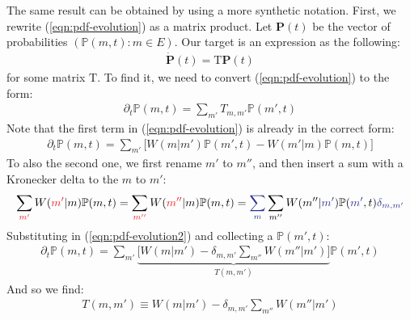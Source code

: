 \documentclass[../../main.tex]{subfiles}
\begin{document}
The same result can be obtained by using a more synthetic notation. First, we rewrite (\ref{eqn:pdf-evolution}) as a matrix product. Let $\bm{P}(t)$ be the vector of probabilities $(\mathbb{P}(m,t)\colon m \in E)$. Our target is an expression as the following:
\begin{align}\label{eqn:pdf-evolution-matrixform}
    \dot{\bm{P}}(t) = \mathrm{T} \bm{P}(t)
\end{align}
for some matrix $\mathrm{T}$. To find it, we need to convert (\ref{eqn:pdf-evolution}) to the form:
\begin{align*}
    \partial_t \mathbb{P}(m,t) = \sum_{m'} T_{m,m'} \mathbb{P}(m',t)
\end{align*}
Note that the first term in (\ref{eqn:pdf-evolution}) is already in the correct form:
\begin{align}\label{eqn:pdf-evolution2}
    \partial_t \mathbb{P}(m,t) = \sum_{m'} \Big[W(m|m') \mathbb{P}(m',t) - W(m'|m)\mathbb{P}(m,t)\Big]
\end{align}
To  also the second one, we first rename $m'$ to $m''$, and then insert a sum with a Kronecker delta to  the $m$ to $m'$:
\begin{align*}
    \sum_{\textcolor{Red}{m'}} W(\textcolor{Red}{m'}|m) \mathbb{P}(m,t) = \sum_{\textcolor{Red}{m''}} W(\textcolor{Red}{m''}|m) \mathbb{P}(m,t) = \textcolor{Blue}{\sum_{m}} \sum_{m''} W(m''|\textcolor{Blue}{m'}) \mathbb{P}(\textcolor{Blue}{m'},t) \textcolor{Blue}{\delta_{m,m'}}
\end{align*}
Substituting in (\ref{eqn:pdf-evolution2}) and collecting a $\mathbb{P}(m',t)$:
\begin{align}\label{eqn:evo-matrix}
    \partial_t \mathbb{P}(m,t) = \sum_{m'} \underbrace{\Big[W(m|m') - \delta_{m,m'} \sum_{m''} W(m''|m') \Big]}_{T(m,m')}  \mathbb{P}(m',t)
\end{align}
And so we find:
\begin{align} \label{eqn:T-matrix}
    T(m,m') \equiv W(m|m') - \delta_{m,m'} \sum_{m''} W(m''|m')
\end{align}
\end{document}

